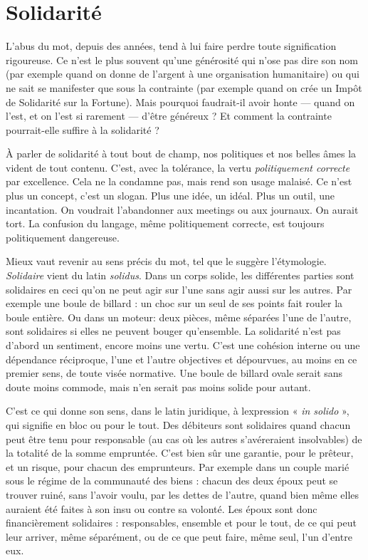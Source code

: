 \section{Solidarité}
L'abus du mot, depuis des années, tend à lui faire perdre
toute signification rigoureuse. Ce n’est le plus souvent qu’une
générosité qui n’ose pas dire son nom (par exemple quand on donne de l'argent
à une organisation humanitaire) ou qui ne sait se manifester que sous la
contrainte (par exemple quand on crée un Impôt de Solidarité sur la Fortune).
Mais pourquoi faudrait-il avoir honte — quand on l’est, et on l’est si
rarement — d’être généreux ? Et comment la contrainte pourrait-elle suffire à la
solidarité ?

À parler de solidarité à tout bout de champ, nos politiques et nos belles
âmes la vident de tout contenu. C’est, avec la tolérance, la vertu {\it politiquement
correcte} par excellence. Cela ne la condamne pas, mais rend son usage malaisé.
Ce n’est plus un concept, c’est un slogan. Plus une idée, un idéal. Plus un outil,
une incantation. On voudrait l’abandonner aux meetings ou aux journaux. On
aurait tort. La confusion du langage, même politiquement correcte, est toujours
politiquement dangereuse.

Mieux vaut revenir au sens précis du mot, tel que le suggère l’étymologie.
{\it Solidaire} vient du latin {\it solidus}. Dans un corps solide, les différentes parties sont
solidaires en ceci qu’on ne peut agir sur l’une sans agir aussi sur les autres. Par
exemple une boule de billard : un choc sur un seul de ses points fait rouler la
boule entière. Ou dans un moteur: deux pièces, même séparées l’une de
l’autre, sont solidaires si elles ne peuvent bouger qu’ensemble. La solidarité
n’est pas d’abord un sentiment, encore moins une vertu. C’est une cohésion
interne ou une dépendance réciproque, l’une et l’autre objectives et dépourvues,
au moins en ce premier sens, de toute visée normative. Une boule de
billard ovale serait sans doute moins commode, mais n’en serait pas moins
solide pour autant.

C’est ce qui donne son sens, dans le latin juridique, à lexpression « {\it in
solido} », qui signifie en bloc ou pour le tout. Des débiteurs sont solidaires
quand chacun peut être tenu pour responsable (au cas où les autres s’avéreraient
insolvables) de la totalité de la somme empruntée. C’est bien sûr une
garantie, pour le prêteur, et un risque, pour chacun des emprunteurs. Par
exemple dans un couple marié sous le régime de la communauté des biens :
chacun des deux époux peut se trouver ruiné, sans l’avoir voulu, par les dettes
de l’autre, quand bien même elles auraient été faites à son insu ou contre sa
volonté. Les époux sont donc financièrement solidaires : responsables, ensemble
et pour le tout, de ce qui peut leur arriver, même séparément, ou de ce que peut
faire, même seul, l’un d’entre eux.

